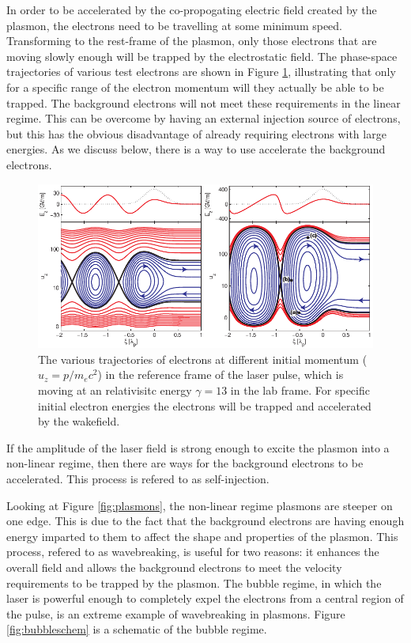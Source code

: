 \documentclass[12pt,letter]{article}
\begin{document}
    In order to be accelerated by the co-propogating electric field created by the
    plasmon, the electrons need to be travelling at some minimum speed.
    Transforming to the rest-frame of the plasmon, only those electrons that are
    moving slowly enough will be trapped by the electrostatic field.
    The phase-space trajectories of various test electrons are shown in Figure
    \ref{fig:trapping}, illustrating that only for a specific range of the
    electron momentum will they actually be able to be trapped. The background
    electrons will not meet these requirements in the linear regime. This can be
    overcome by having an external injection source of electrons, but this has
    the obvious disadvantage of already requiring electrons with large energies.
    As we discuss below, there is a way to use accelerate the background
    electrons.
\begin{figure}[h]%
    \includegraphics[width=\textwidth]{../figures/trapping.pdf}
    \caption{\label{fig:trapping} The various trajectories of electrons at
    different initial momentum ($u_z= p/m_e c^2$) in the reference frame of the laser
pulse, which is moving at an relativisitc energy $\gamma = 13$ in the lab frame.
For specific initial electron energies the electrons will be trapped and
accelerated by the wakefield. }
\end{figure}


    If the amplitude of the laser field is strong enough to excite the plasmon into a non-linear regime, then there are ways for the background electrons to be
accelerated. This process is refered to as self-injection. 
    
    Looking at Figure \ref{fig:plasmons}, the
    non-linear regime plasmons are steeper on one edge. This is due to the fact
    that the background electrons are having enough energy imparted to them to
    affect the shape and properties of the plasmon. This process, refered to as
    wavebreaking, is useful for
    two reasons: it enhances the overall field and allows the background
    electrons to meet the velocity requirements to be trapped by the plasmon.
    The bubble regime, in which the laser is powerful enough to completely
    expel the electrons from a central region of the pulse, is an extreme
    example of wavebreaking in plasmons. Figure \ref{fig:bubbleschem} is a
    schematic of the bubble regime.
\end{document}
